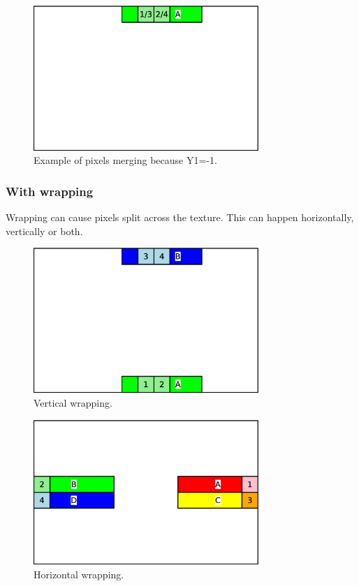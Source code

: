 \documentclass[a4paper,11pt]{article}
\begin{document}
\begin{figure}[H]
\centering
\includegraphics[height=55mm]{dist_clamp.eps}
\caption{Example of pixels merging because Y1=-1.}\label{fig:caseclamp}
\end{figure}

\subsubsection{With wrapping}
Wrapping can cause pixels split across the texture. This can happen horizontally, vertically or both.

\begin{figure}[H]
\centering
\includegraphics[height=55mm]{dist_wrap1.eps}
\caption{Vertical wrapping.}\label{fig:casewrap1}
\end{figure}

\begin{figure}[H]
\centering
\includegraphics[height=55mm]{dist_wrap2.eps}
\caption{Horizontal wrapping.}\label{fig:casewrap2}
\end{figure}
\end{document}
